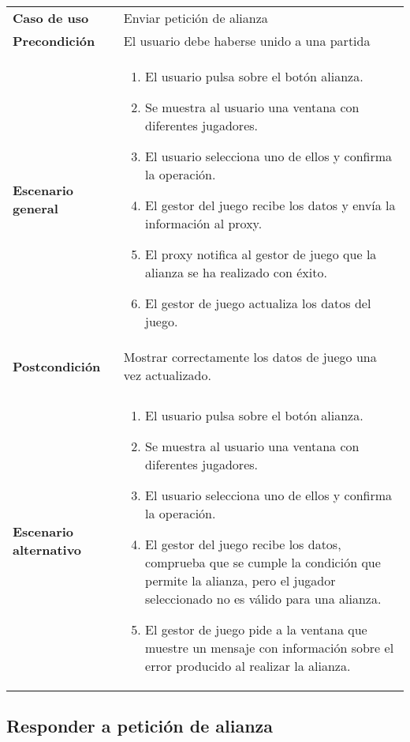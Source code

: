 {\footnotesize
\begin{tabularx}{0.95\textwidth}{p{}|X}

\textbf{Caso de uso} & Enviar petición de alianza \\

\textbf{Precondición} & El usuario debe haberse unido a una partida \\

\textbf{Escenario general} & \begin{enumerate}
\item El usuario pulsa sobre el botón alianza.
\item Se muestra al usuario una ventana con diferentes jugadores.
\item El usuario selecciona uno de ellos y confirma la operación.
\item El gestor del juego recibe los datos y envía la información al proxy.
\item El proxy notifica al gestor de juego que la alianza se ha realizado con
éxito.
\item El gestor de juego actualiza los datos del juego.
\end{enumerate} \\
\textbf{Postcondición} & Mostrar correctamente los datos de juego una vez
actualizado.\\ \\
\textbf{Escenario alternativo} & \begin{enumerate}
\item El usuario pulsa sobre el botón alianza.
\item Se muestra al usuario una ventana con diferentes jugadores.
\item El usuario selecciona uno de ellos y confirma la operación.
\item El gestor del juego recibe los datos, comprueba que se cumple la condición
que permite la alianza, pero el jugador seleccionado no es válido para una
alianza.
\item El gestor de juego pide a la ventana que muestre un mensaje con
información sobre el error producido al realizar la alianza.
\end{enumerate}\\
\end{tabularx}
}

\subsection{Responder a petición de alianza}

